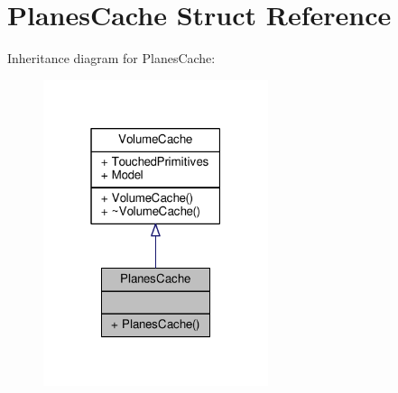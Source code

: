 \hypertarget{structPlanesCache}{}\section{Planes\+Cache Struct Reference}
\label{structPlanesCache}


Inheritance diagram for Planes\+Cache\+:
\nopagebreak
\begin{figure}[H]
\begin{center}
\leavevmode
\includegraphics[width=187pt]{d0/d4b/structPlanesCache__inherit__graph}
\end{center}
\end{figure}


